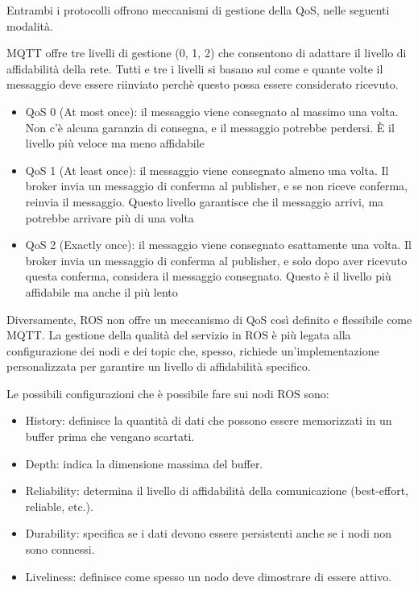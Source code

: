 \noindent Entrambi i protocolli offrono meccanismi di gestione della QoS, nelle seguenti modalità.

\noindent MQTT offre tre livelli di gestione (0, 1, 2) che consentono di adattare il livello di affidabilità della rete. Tutti e tre i livelli si basano sul come e quante volte il messaggio deve essere riinviato perchè questo possa essere considerato ricevuto. 

\begin{itemize}
  \item QoS 0 (At most once): il messaggio viene consegnato al massimo una volta. Non c'è alcuna garanzia di consegna, e il messaggio potrebbe perdersi. È il livello più veloce ma meno affidabile
  \item QoS 1 (At least once): il messaggio viene consegnato almeno una volta. Il broker invia un messaggio di conferma al publisher, e se non riceve conferma, reinvia il messaggio. Questo livello garantisce che il messaggio arrivi, ma potrebbe arrivare più di una volta
  \item QoS 2 (Exactly once): il messaggio viene consegnato esattamente una volta. Il broker invia un messaggio di conferma al publisher, e solo dopo aver ricevuto questa conferma, considera il messaggio consegnato. Questo è il livello più affidabile ma anche il più lento
\end{itemize}

\noindent Diversamente, ROS non offre un meccanismo di QoS così definito e flessibile come MQTT. La gestione della qualità del servizio in ROS è più legata alla configurazione dei nodi e dei topic che, spesso, richiede un'implementazione personalizzata per garantire un livello di affidabilità specifico. 

Le possibili configurazioni che è possibile fare sui nodi ROS sono:
\begin{itemize}
  \item History: definisce la quantità di dati che possono essere memorizzati in un buffer prima che vengano scartati.
  \item Depth: indica la dimensione massima del buffer.
  \item Reliability: determina il livello di affidabilità della comunicazione (best-effort, reliable, etc.).
  \item Durability: specifica se i dati devono essere persistenti anche se i nodi non sono connessi.
  \item Liveliness: definisce come spesso un nodo deve dimostrare di essere attivo.
\end{itemize}

